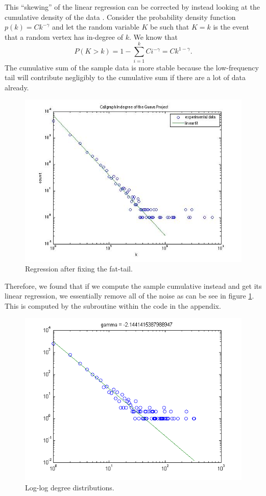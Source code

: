 \documentclass[11pt,a4paper,twocolumn]{article}
\begin{document}
\begin{singlespace}
This ``skewing'' of the linear regression can be corrected by instead looking at the
cumulative density of the data \cite{CLASS}. Consider the probability density function
$p(k) = C k^{-\gamma}$ and let the random variable $K$ be such that $K = k$ is the
event that a random vertex has in-degree of $k$. We know that
$$P(K > k) = 1 - \sum_{i = 1}^k Ci^{-\gamma} = Ck^{1 - \gamma}.$$
The cumulative sum of the sample data is more stable because the low-frequency
tail will contribute negligibly to the cumulative sum if there are a lot of data already.
\begin{figure}[H]
\centering
\includegraphics[scale=0.45]{images/guava}
\caption{Regression after fixing the fat-tail.\label{fig:guava}}
\end{figure}
Therefore, we found that if we compute the sample cumulative instead and get its
linear regression, we essentially remove all of the noise as can be see in figure
\ref{fig:guava}.
This is computed by the  subroutine within the code in
the appendix.
\begin{figure}
\centering
\caption{Log-log degree distributions.\label{fig:deg}}
\includegraphics[scale=0.5]{images/antlr}

\end{figure}
\end{singlespace}
\end{document}
